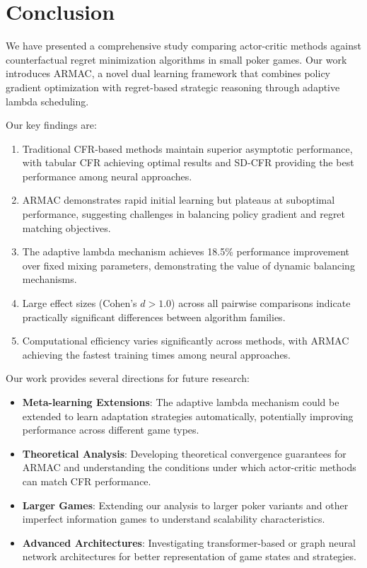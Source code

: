 \documentclass{icml2024}
\begin{document}
\section{Conclusion}

We have presented a comprehensive study comparing actor-critic methods against counterfactual regret minimization algorithms in small poker games. Our work introduces ARMAC, a novel dual learning framework that combines policy gradient optimization with regret-based strategic reasoning through adaptive lambda scheduling.

Our key findings are:
\begin{enumerate}
\item Traditional CFR-based methods maintain superior asymptotic performance, with tabular CFR achieving optimal results and SD-CFR providing the best performance among neural approaches.
\item ARMAC demonstrates rapid initial learning but plateaus at suboptimal performance, suggesting challenges in balancing policy gradient and regret matching objectives.
\item The adaptive lambda mechanism achieves 18.5\% performance improvement over fixed mixing parameters, demonstrating the value of dynamic balancing mechanisms.
\item Large effect sizes (Cohen's $d > 1.0$) across all pairwise comparisons indicate practically significant differences between algorithm families.
\item Computational efficiency varies significantly across methods, with ARMAC achieving the fastest training times among neural approaches.
\end{enumerate}

Our work provides several directions for future research:
\begin{itemize}
\item \textbf{Meta-learning Extensions}: The adaptive lambda mechanism could be extended to learn adaptation strategies automatically, potentially improving performance across different game types.
\item \textbf{Theoretical Analysis}: Developing theoretical convergence guarantees for ARMAC and understanding the conditions under which actor-critic methods can match CFR performance.
\item \textbf{Larger Games}: Extending our analysis to larger poker variants and other imperfect information games to understand scalability characteristics.
\item \textbf{Advanced Architectures}: Investigating transformer-based or graph neural network architectures for better representation of game states and strategies.
\end{itemize}
\end{document}
